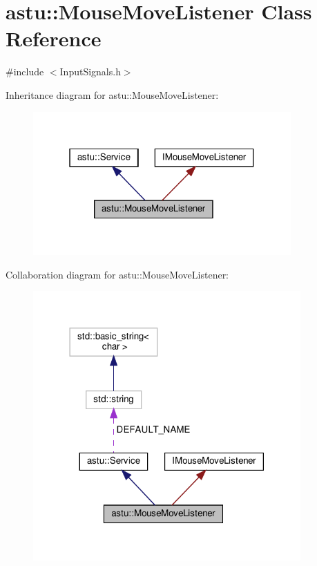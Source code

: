 \hypertarget{classastu_1_1MouseMoveListener}{}\section{astu\+:\+:Mouse\+Move\+Listener Class Reference}
\label{classastu_1_1MouseMoveListener}


{\ttfamily \#include $<$Input\+Signals.\+h$>$}



Inheritance diagram for astu\+:\+:Mouse\+Move\+Listener\+:\nopagebreak
\begin{figure}[H]
\begin{center}
\leavevmode
\includegraphics[width=280pt]{classastu_1_1MouseMoveListener__inherit__graph}
\end{center}
\end{figure}


Collaboration diagram for astu\+:\+:Mouse\+Move\+Listener\+:\nopagebreak
\begin{figure}[H]
\begin{center}
\leavevmode
\includegraphics[width=290pt]{classastu_1_1MouseMoveListener__coll__graph}
\end{center}
\end{figure}
